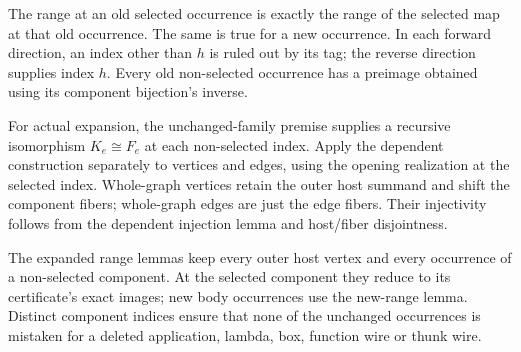 

The range at an old selected occurrence is exactly the range of the selected
map at that old occurrence. The same is true for a new occurrence. In each
forward direction, an index other than $h$ is ruled out by its tag; the
reverse direction supplies index $h$. Every old non-selected occurrence has
a preimage obtained using its component bijection's inverse.




For actual expansion, the unchanged-family premise supplies a recursive
isomorphism $K_e\cong F_e$ at each non-selected index. Apply the dependent
construction separately to vertices and edges, using the opening realization
at the selected index. Whole-graph vertices retain the outer host summand and
shift the component fibers; whole-graph edges are just the edge fibers.
Their injectivity follows from the dependent injection lemma and host/fiber
disjointness.








The expanded range lemmas keep every outer host vertex and every occurrence
of a non-selected component. At the selected component they reduce to its
certificate's exact images; new body occurrences use the new-range lemma.
Distinct component indices ensure that none of the unchanged occurrences is
mistaken for a deleted application, lambda, box, function wire or thunk wire.

